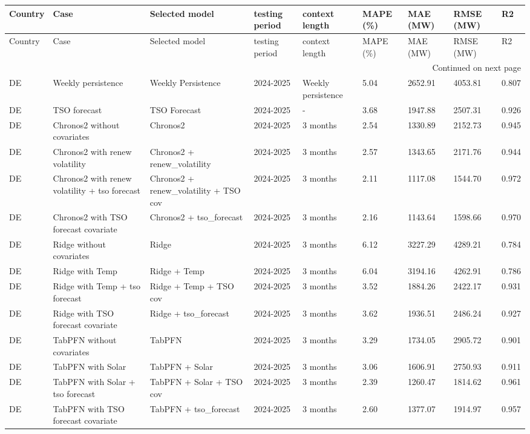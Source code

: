 \begin{longtable}{lllllllll}
\toprule
Country & Case & Selected model & testing period & context length & MAPE (\%) & MAE (MW) & RMSE (MW) & R2 \\
\midrule
\endfirsthead
\toprule
Country & Case & Selected model & testing period & context length & MAPE (\%) & MAE (MW) & RMSE (MW) & R2 \\
\midrule
\endhead
\midrule
\multicolumn{9}{r}{Continued on next page} \\
\midrule
\endfoot
\bottomrule
\endlastfoot
DE & Weekly persistence & Weekly Persistence & 2024-2025 & Weekly persistence & 5.04 & 2652.91 & 4053.81 & 0.807 \\
DE & TSO forecast & TSO Forecast & 2024-2025 & - & 3.68 & 1947.88 & 2507.31 & 0.926 \\
DE & Chronos2 without covariates & Chronos2 & 2024-2025 & 3 months & 2.54 & 1330.89 & 2152.73 & 0.945 \\
DE & Chronos2 with renew volatility & Chronos2 + renew\_volatility & 2024-2025 & 3 months & 2.57 & 1343.65 & 2171.76 & 0.944 \\
DE & Chronos2 with renew volatility + tso forecast & Chronos2 + renew\_volatility + TSO cov & 2024-2025 & 3 months & 2.11 & 1117.08 & 1544.70 & 0.972 \\
DE & Chronos2 with TSO forecast covariate & Chronos2 + tso\_forecast & 2024-2025 & 3 months & 2.16 & 1143.64 & 1598.66 & 0.970 \\
DE & Ridge without covariates & Ridge & 2024-2025 & 3 months & 6.12 & 3227.29 & 4289.21 & 0.784 \\
DE & Ridge with Temp & Ridge + Temp & 2024-2025 & 3 months & 6.04 & 3194.16 & 4262.91 & 0.786 \\
DE & Ridge with Temp + tso forecast & Ridge + Temp + TSO cov & 2024-2025 & 3 months & 3.52 & 1884.26 & 2422.17 & 0.931 \\
DE & Ridge with TSO forecast covariate & Ridge + tso\_forecast & 2024-2025 & 3 months & 3.62 & 1936.51 & 2486.24 & 0.927 \\
DE & TabPFN without covariates & TabPFN & 2024-2025 & 3 months & 3.29 & 1734.05 & 2905.72 & 0.901 \\
DE & TabPFN with Solar & TabPFN + Solar & 2024-2025 & 3 months & 3.06 & 1606.91 & 2750.93 & 0.911 \\
DE & TabPFN with Solar + tso forecast & TabPFN + Solar + TSO cov & 2024-2025 & 3 months & 2.39 & 1260.47 & 1814.62 & 0.961 \\
DE & TabPFN with TSO forecast covariate & TabPFN + tso\_forecast & 2024-2025 & 3 months & 2.60 & 1377.07 & 1914.97 & 0.957 \\
\end{longtable}
